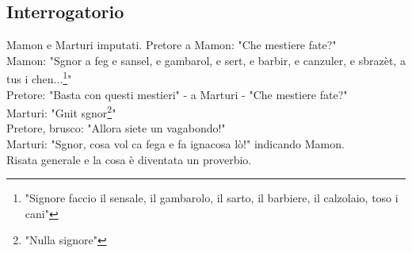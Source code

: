 \documentclass[10pt]{memoir} %
\begin{document}
\subsection{Interrogatorio}
Mamon e Marturi imputati. Pretore a Mamon: "Che mestiere fate?"\\
Mamon: "Sgnor a feg e sansel, e gambarol, e sert, e barbir, e canzuler, e sbrazèt, a tus i chen...\footnote{"Signore faccio il sensale, il gambarolo, il sarto, il barbiere, il calzolaio, toso i cani"}"\\
Pretore: "Basta con questi mestieri" - a Marturi - "Che mestiere fate?"\\
Marturi: "Gnit sgnor\footnote{"Nulla signore"}"\\
Pretore, brusco: "Allora siete un vagabondo!"\\
Marturi: "Sgnor, cosa vol ca fega e fa ignacosa lò!" indicando Mamon.\\
Risata generale e la cosa è diventata un proverbio.
\end{document}
